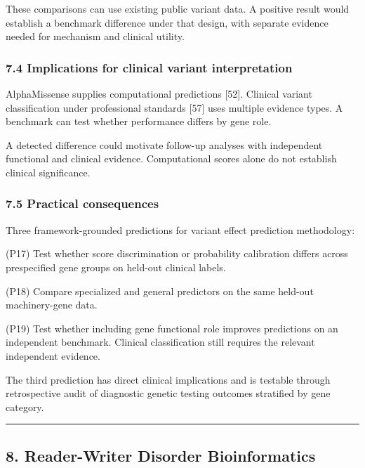 \documentclass[
]{article}
\begin{document}
These comparisons can use existing public variant data. A positive
result would establish a benchmark difference under that design, with
separate evidence needed for mechanism and clinical utility.

\hypertarget{implications-for-clinical-variant-interpretation}{%
\subsubsection{7.4 Implications for clinical variant
interpretation}\label{implications-for-clinical-variant-interpretation}}

AlphaMissense supplies computational predictions {[}52{]}. Clinical
variant classification under professional standards {[}57{]} uses
multiple evidence types. A benchmark can test whether performance
differs by gene role.

A detected difference could motivate follow-up analyses with independent
functional and clinical evidence. Computational scores alone do not
establish clinical significance.

\hypertarget{practical-consequences-5}{%
\subsubsection{7.5 Practical
consequences}\label{practical-consequences-5}}

Three framework-grounded predictions for variant effect prediction
methodology:

(P17) Test whether score discrimination or probability calibration
differs across prespecified gene groups on held-out clinical labels.

(P18) Compare specialized and general predictors on the same held-out
machinery-gene data.

(P19) Test whether including gene functional role improves predictions
on an independent benchmark. Clinical classification still requires the
relevant independent evidence.

The third prediction has direct clinical implications and is testable
through retrospective audit of diagnostic genetic testing outcomes
stratified by gene category.

\begin{center}\rule{0.5\linewidth}{0.5pt}\end{center}

\hypertarget{reader-writer-disorder-bioinformatics}{%
\subsection{8. Reader-Writer Disorder
Bioinformatics}\label{reader-writer-disorder-bioinformatics}}
\end{document}
